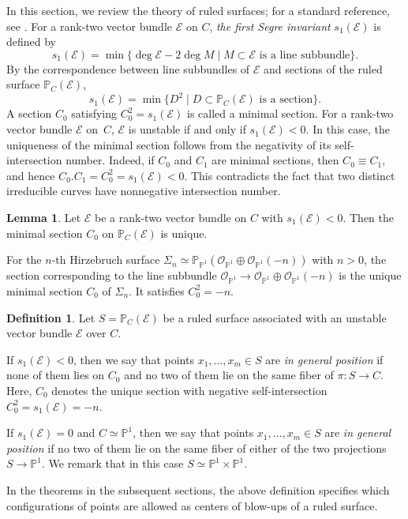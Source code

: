 \documentclass[reqno]{amsart}
\theoremstyle{definition}
\newtheorem{Def}{Definition}
\newtheorem{Lemma}[Thm]{Lemma}
\newcommand{\PP}{\mathbb{P}}
\newcommand{\Ee}{\mathcal{E}}
\newcommand{\Oo}{\mathcal{O}}
\begin{document}
In this section, we review the theory of ruled surfaces; for a standard reference, see \cite[Section V.2]{Har77}.
For a rank-two vector bundle $\Ee$ on $C$, \emph{the first Segre invariant} $s_1(\Ee)$ is defined by
\[
s_1(\Ee)
=\min\{\deg \Ee-2\deg M \mid M\subset \Ee \text{ is a line subbundle}\}.
\]
By the correspondence between line subbundles of $\Ee$ and sections of the ruled surface $\PP_C(\Ee)$,
\[
s_1(\Ee)=\min\{D^2\mid D\subset \PP_C(\Ee) \text{ is a section}\}.
\]
A section $C_0$ satisfying $C_0^2=s_1(\Ee)$ is called a minimal section.
For a rank-two vector bundle $\Ee$ on~$C$, $\Ee$ is unstable if and only if $s_1(\Ee)<0$.
In this case, the uniqueness of the minimal section follows from the negativity of its self-intersection number.
Indeed, if $C_0$ and $C_1$ are minimal sections, then $C_0\equiv C_1$, and hence $C_0.C_1=C_0^2=s_1(\Ee)<0$.
This contradicts the fact that two distinct irreducible curves have nonnegative intersection number.

\begin{Lemma}\label{unique-minimal-section}
Let $\Ee$ be a rank-two vector bundle on $C$ with $s_1(\Ee)<0$.
Then the minimal section $C_0$ on $\PP_C(\Ee)$ is unique.
\end{Lemma}

For the $n$-th Hirzebruch surface $\Sigma_n\simeq \PP_{\PP^1}(\Oo_{\PP^1}\oplus\Oo_{\PP^1}(-n))$ with $n>0$, the section corresponding to the line subbundle $\Oo_{\PP^1}\to \Oo_{\PP^1}\oplus\Oo_{\PP^1}(-n)$ is the unique minimal section $C_0$ of $\Sigma_n$.
It satisfies $C_0^2=-n$.

\begin{Def}\label{general-position}
Let $S=\PP_C(\Ee)$ be a ruled surface associated with an unstable vector bundle $\Ee$ over $C$.

If $s_1(\Ee)<0$, then we say that points $x_1,\ldots,x_m\in S$ are \emph{in general position} if none of them lies on $C_0$ and no two of them lie on the same fiber of $\pi:S\to C$.
Here, $C_0$ denotes the unique section with negative self-intersection $C_0^2=s_1(\Ee)=-n$.

If $s_1(\Ee)=0$ and $C\simeq \PP^1$, then we say that points $x_1,\ldots,x_m\in S$ are \emph{in general position} if no two of them lie on the same fiber of either of the two projections $S\to \PP^1$.
We remark that in this case $S\simeq \PP^1\times\PP^1$.
\end{Def}

In the theorems in the subsequent sections, the above definition specifies which configurations of points are allowed as centers of blow-ups of a ruled surface.
\end{document}
